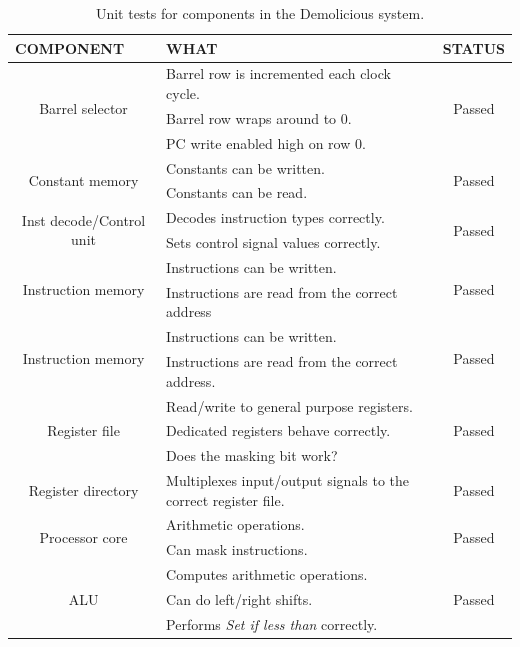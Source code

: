 \documentclass[../main/report.tex]{subfiles}
\begin{document}
\begin{table}[H]
	\centering
	\begin{tabularx}{\textwidth}{|c|X|c|}
	        \multicolumn{1}{l}{\scriptsize COMPONENT} &
	        \multicolumn{1}{l}{\scriptsize WHAT} &
	        \multicolumn{1}{l}{\scriptsize STATUS} \\
	\hline  \multirow{3}{*}{Barrel selector} 		  & Barrel row is incremented each clock cycle.  & \multirow{3}{*}{ Passed } \\
	 										 		  & Barrel row wraps around to 0. & \\			
	 										 		  & PC write enabled high on row 0.& \\								
	\hline  \multirow{2}{*}{Constant memory} 	      & Constants can be written.  & \multirow{2}{*}{ Passed } \\
	 										 		  & Constants can be read. & \\												
	\hline \multirow{2}{*}{Inst decode/Control unit}  & Decodes instruction types correctly. & \multirow{2}{*}{ Passed } \\
		   											  & Sets control signal values correctly. &\\
	\hline \multirow{2}{*}{Instruction memory} 		  & Instructions can be written. & \multirow{2}{*}{ Passed } \\
													  & Instructions are read from the correct address  & \\ 
	\hline \multirow{2}{*}{Instruction memory} 		  & Instructions can be written. & \multirow{2}{*}{ Passed } \\
													  & Instructions are read from the correct address.  & \\ 
	\hline \multirow{3}{*}{Register file} 		  	  & Read/write to general purpose registers. & \multirow{3}{*}{ Passed } \\
													  & Dedicated registers behave correctly.  & \\ 
													  & Does the masking bit work?  & \\ 													  
	\hline  Register directory 		 				  & Multiplexes input/output signals to the correct register file. & Passed  \\
	
	\hline \multirow{2}{*}{Processor core} 		  	  & Arithmetic operations. & \multirow{2}{*}{ Passed } \\
													  & Can mask instructions.  & \\ 
													  
	\hline \multirow{3}{*}{ALU} 		  			  & Computes arithmetic operations. & \multirow{3}{*}{ Passed } \\
													  & Can do left/right shifts.  & \\ 
													  & Performs \emph{Set if less than} correctly. &	\\								  											  
	\hline
	\end{tabularx} 
	\caption{Unit tests for components in the Demolicious system.}
	\label{tab:vhdl_unit_tests}
\end{table}
\end{document}
